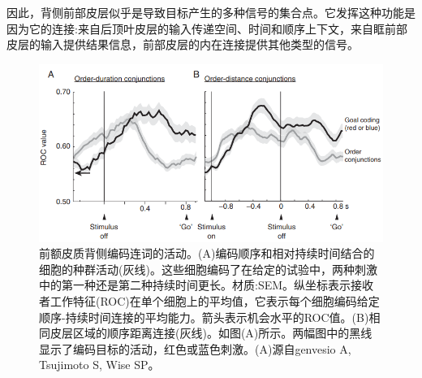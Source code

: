 因此，背侧前部皮层似乎是导致目标产生的多种信号的集合点。它发挥这种功能是因为它的连接:来自后顶叶皮层的输入传递空间、时间和顺序上下文，来自眶前部皮层的输入提供结果信息，前部皮层的内在连接提供其他类型的信号。
\begin{figure}
	\centering
	\includegraphics[width=0.5\linewidth]{image_pfc/Fig_6_14}
	\caption{前额皮质背侧编码连词的活动。(A)编码顺序和相对持续时间结合的细胞的种群活动(灰线)。这些细胞编码了在给定的试验中，两种刺激中的第一种还是第二种持续时间更长。材质:SEM。纵坐标表示接收者工作特征(ROC)在单个细胞上的平均值，它表示每个细胞编码给定顺序-持续时间连接的平均能力。箭头表示机会水平的ROC值。(B)相同皮层区域的顺序距离连接(灰线)。如图(A)所示。两幅图中的黑线显示了编码目标的活动，红色或蓝色刺激。(A)源自genvesio A, Tsujimoto S, Wise SP。}
	\label{fig:fig}
\end{figure}

